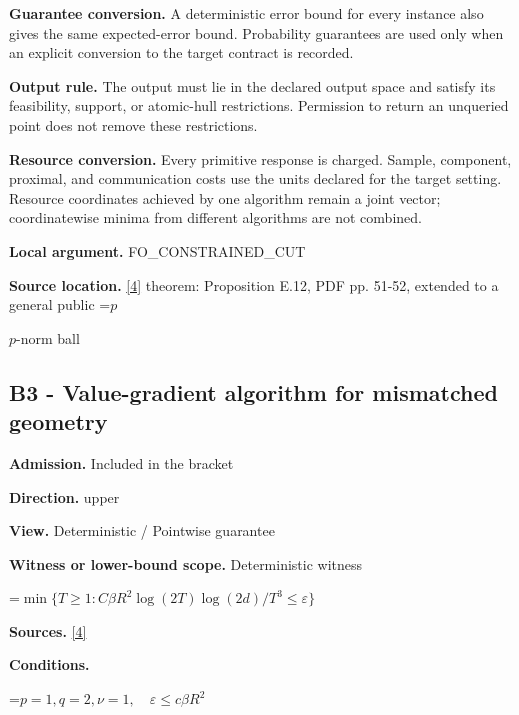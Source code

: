 \documentclass[10pt,a4paper]{article}
\newcommand{\AtlasMath}[1]{\par\begingroup\centering\setbox0=\hbox{$\displaystyle #1$}\ifdim\wd0>1.4\linewidth\typeout{ATLAS WIDE FORMULA: \the\wd0}\fi\ifdim\wd0>\linewidth\resizebox{\linewidth}{!}{\box0}\else\box0\fi\par\endgroup}
\newcommand{\AtlasInlineMath}[1]{\begingroup\setbox0=\hbox{$#1$}\ifdim\wd0>.4\linewidth\endgroup\AtlasMath{#1}\else\endgroup$#1$\fi}
\begin{document}
\textbf{Guarantee conversion.} A deterministic error bound for every instance also gives the same expected-error bound. Probability guarantees are used only when an explicit conversion to the target contract is recorded.



\textbf{Output rule.} The output must lie in the declared output space and satisfy its feasibility, support, or atomic-hull restrictions. Permission to return an unqueried point does not remove these restrictions.



\textbf{Resource conversion.} Every primitive response is charged. Sample, component, proximal, and communication costs use the units declared for the target setting. Resource coordinates achieved by one algorithm remain a joint vector; coordinatewise minima from different algorithms are not combined.



\textbf{Local argument.} FO\_CONSTRAINED\_CUT



\textbf{Source location.} \href{https://arxiv.org/pdf/2609.32910}{[4]} theorem: Proposition E.12, PDF pp. 51-52, extended to a general public \AtlasInlineMath{p}-norm ball



\subsection{B3 - Value-gradient algorithm for mismatched geometry}


\textbf{Admission.} Included in the bracket



\textbf{Direction.} upper



\textbf{View.} Deterministic / Pointwise guarantee



\textbf{Witness or lower-bound scope.} Deterministic witness



\AtlasMath{\min\{T\ge1:C\beta R^2\log(2T)\log(2d)/T^3\le\varepsilon\}}


\textbf{Sources.} \href{https://arxiv.org/pdf/2609.32910}{[4]}



\textbf{Conditions.}
\AtlasMath{p=1,q=2,\nu=1,\quad\varepsilon\le c\beta R^2}
\end{document}
